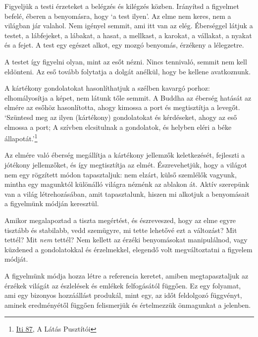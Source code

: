 Figyeljük a testi érzeteket a belégzés és kilégzés közben. Irányítsd a
figyelmet befelé, éberen a benyomásra, hogy `a test ilyen'. Az elme nem
keres, nem a világban jár valahol. Nem igényel semmit, ami itt van az
elég. Éberséggel látjuk a testet, a lábfejeket, a lábakat, a hasat, a
mellkast, a karokat, a vállakat, a nyakat és a fejet. A test egy egészet
alkot, egy mozgó benyomás, érzékeny a lélegzetre.

\enlargethispage*{\baselineskip}

A testet így figyelni olyan, mint az esőt nézni. Nincs tennivaló, semmit
nem kell eldönteni. Az eső tovább folytatja a dolgát anélkül, hogy be
kellene avatkoznunk.

\clearpage

\vspace*{-\baselineskip}


A kártékony gondolatokat hasonlíthatjuk a szélben kavargó porhoz:
elhomályosítja a képet, nem látunk tőle semmit. A Buddha az éberség
hatását az elmére az esőhöz hasonlította, ahogy kimossa a port és
megtisztítja a levegőt. `Szüntesd meg az ilyen (kártékony) gondolatokat
és kérdéseket, ahogy az eső elmossa a port; A szívben elcsitulnak a
gondolatok, és helyben eléri a béke állapotát.'\footnote{\href{https://suttacentral.net/iti87/en/sujato}{Iti
  87}, A Látás Pusztítói}

Az elmére való éberség megállítja a kártékony jellemzők keletkezését,
fejleszti a jótékony jellemzőket, és így megtisztítja az elmét.
Észrevehetjük, hogy a világot nem egy rögzített módon tapasztaljuk: nem
elzárt, külső szemlélők vagyunk, mintha egy magunktól különálló világra
néznénk az ablakon át. Aktív szerepünk van a világ létrehozásában, amit
tapasztalunk, hiszen mi alkotjuk a benyomásait a figyelmünk módján
keresztül.

Amikor megalapoztad a tiszta megértést, és észreveszed, hogy az elme
egyre tisztább és stabilabb, vedd szemügyre, mi tette lehetővé ezt a
változást? Mit tettél? Mit \emph{nem} tettél? Nem kellett az érzéki
benyomásokat manipulálnod, vagy küzdened a gondolatokkal és érzelmekkel,
elegendő volt megváltoztatni a figyelem módját.

A figyelmünk módja hozza létre a referencia keretet, amiben
megtapasztaljuk az érzékek világát az észlelések és emlékek felfogásától
függően. Ez egy folyamat, ami egy bizonyos hozzáállást produkál, mint
egy, az időt feldolgozó függvényt, aminek eredményétől függően
felismerjük és értelmezzük önmagunkat a jelenben.

